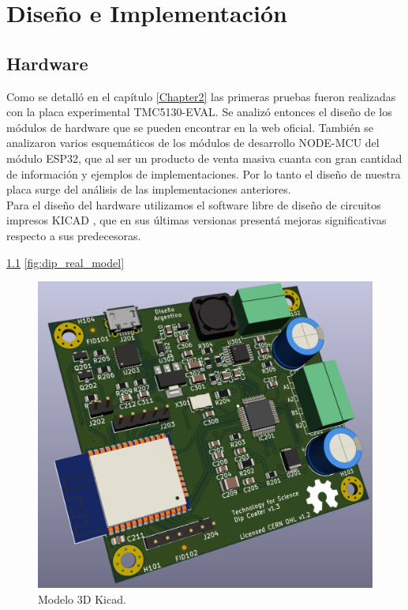 
\chapter{Diseño e Implementación} %

\label{Chapter3} %

\section{Hardware}

Como se detalló en el capítulo \ref{Chapter2} las primeras pruebas fueron realizadas con la placa experimental TMC5130-EVAL. Se analizó entonces el diseño de los módulos de hardware que se pueden encontrar en la web oficial\citep{3_web_trinamic}. También se analizaron varios esquemáticos de los módulos de desarrollo NODE-MCU del módulo ESP32, que al ser un producto de venta masiva cuanta con gran cantidad de información y ejemplos de implementaciones. Por lo tanto el diseño de nuestra placa surge del análisis de las implementaciones anteriores.
\\
Para el diseño del hardware utilizamos el software libre de diseño de circuitos impresos KICAD \citep{web_kicad}, que en sus últimas versionas presentá mejoras significativas respecto a sus predecesoras.

\ref{fig:dip_3d_model}
\ref{fig:dip_real_model}

\begin{figure}[htbp]
	\centering
	\includegraphics[width=.5\textwidth]{./Figures/dip_3d_model.pdf}
	\caption{Modelo 3D Kicad.}
	\label{fig:dip_3d_model}
\end{figure}
         

